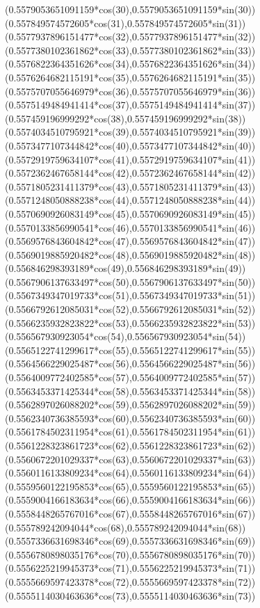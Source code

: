 {({0.5579053651091159*cos(30)},{0.5579053651091159*sin(30)})
({0.557849574572605*cos(31)},{0.557849574572605*sin(31)})
({0.5577937896151477*cos(32)},{0.5577937896151477*sin(32)})
({0.5577380102361862*cos(33)},{0.5577380102361862*sin(33)})
({0.5576822364351626*cos(34)},{0.5576822364351626*sin(34)})
({0.5576264682115191*cos(35)},{0.5576264682115191*sin(35)})
({0.5575707055646979*cos(36)},{0.5575707055646979*sin(36)})
({0.5575149484941414*cos(37)},{0.5575149484941414*sin(37)})
({0.557459196999292*cos(38)},{0.557459196999292*sin(38)})
({0.5574034510795921*cos(39)},{0.5574034510795921*sin(39)})
({0.5573477107344842*cos(40)},{0.5573477107344842*sin(40)})
({0.5572919759634107*cos(41)},{0.5572919759634107*sin(41)})
({0.5572362467658144*cos(42)},{0.5572362467658144*sin(42)})
({0.5571805231411379*cos(43)},{0.5571805231411379*sin(43)})
({0.5571248050888238*cos(44)},{0.5571248050888238*sin(44)})
({0.5570690926083149*cos(45)},{0.5570690926083149*sin(45)})
({0.5570133856990541*cos(46)},{0.5570133856990541*sin(46)})
({0.5569576843604842*cos(47)},{0.5569576843604842*sin(47)})
({0.5569019885920482*cos(48)},{0.5569019885920482*sin(48)})
({0.556846298393189*cos(49)},{0.556846298393189*sin(49)})
({0.5567906137633497*cos(50)},{0.5567906137633497*sin(50)})
({0.5567349347019733*cos(51)},{0.5567349347019733*sin(51)})
({0.5566792612085031*cos(52)},{0.5566792612085031*sin(52)})
({0.5566235932823822*cos(53)},{0.5566235932823822*sin(53)})
({0.556567930923054*cos(54)},{0.556567930923054*sin(54)})
({0.5565122741299617*cos(55)},{0.5565122741299617*sin(55)})
({0.5564566229025487*cos(56)},{0.5564566229025487*sin(56)})
({0.5564009772402585*cos(57)},{0.5564009772402585*sin(57)})
({0.5563453371425344*cos(58)},{0.5563453371425344*sin(58)})
({0.5562897026088202*cos(59)},{0.5562897026088202*sin(59)})
({0.5562340736385593*cos(60)},{0.5562340736385593*sin(60)})
({0.5561784502311954*cos(61)},{0.5561784502311954*sin(61)})
({0.5561228323861723*cos(62)},{0.5561228323861723*sin(62)})
({0.5560672201029337*cos(63)},{0.5560672201029337*sin(63)})
({0.5560116133809234*cos(64)},{0.5560116133809234*sin(64)})
({0.5559560122195853*cos(65)},{0.5559560122195853*sin(65)})
({0.5559004166183634*cos(66)},{0.5559004166183634*sin(66)})
({0.5558448265767016*cos(67)},{0.5558448265767016*sin(67)})
({0.555789242094044*cos(68)},{0.555789242094044*sin(68)})
({0.5557336631698346*cos(69)},{0.5557336631698346*sin(69)})
({0.5556780898035176*cos(70)},{0.5556780898035176*sin(70)})
({0.5556225219945373*cos(71)},{0.5556225219945373*sin(71)})
({0.5555669597423378*cos(72)},{0.5555669597423378*sin(72)})
({0.5555114030463636*cos(73)},{0.5555114030463636*sin(73)})
}
